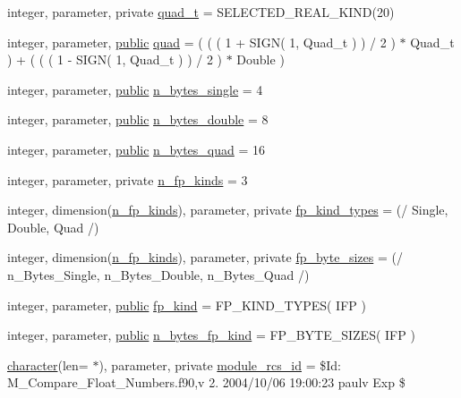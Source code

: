 \begin{DoxyCompactItemize}
integer, parameter, private \hyperlink{namespacem__compare__float__numbers_a3cb67561a1bb5038eddb1aafcce81199}{quad\+\_\+t} = S\+E\+L\+E\+C\+T\+E\+D\+\_\+\+R\+E\+A\+L\+\_\+\+K\+I\+ND(20)
\item 
integer, parameter, \hyperlink{M__stopwatch_83_8txt_a2f74811300c361e53b430611a7d1769f}{public} \hyperlink{namespacem__compare__float__numbers_af11cd62e9032de86b00de623b4eb5c2c}{quad} = ( ( ( 1 + S\+I\+GN( 1, Quad\+\_\+t ) ) / 2 ) $\ast$ Quad\+\_\+t ) + ( ( ( 1 -\/ S\+I\+GN( 1, Quad\+\_\+t ) ) / 2 ) $\ast$ Double )
\item 
integer, parameter, \hyperlink{M__stopwatch_83_8txt_a2f74811300c361e53b430611a7d1769f}{public} \hyperlink{namespacem__compare__float__numbers_a8d387475f5c4f6cc89da998183cf9077}{n\+\_\+bytes\+\_\+single} = 4
\item 
integer, parameter, \hyperlink{M__stopwatch_83_8txt_a2f74811300c361e53b430611a7d1769f}{public} \hyperlink{namespacem__compare__float__numbers_a801fa0d9fea2f2c025618157c128bfe2}{n\+\_\+bytes\+\_\+double} = 8
\item 
integer, parameter, \hyperlink{M__stopwatch_83_8txt_a2f74811300c361e53b430611a7d1769f}{public} \hyperlink{namespacem__compare__float__numbers_abbe80858664126778bff36ea408c71dc}{n\+\_\+bytes\+\_\+quad} = 16
\item 
integer, parameter, private \hyperlink{namespacem__compare__float__numbers_ae5e226645a7448efabc625aa89e78a20}{n\+\_\+fp\+\_\+kinds} = 3
\item 
integer, dimension(\hyperlink{namespacem__compare__float__numbers_ae5e226645a7448efabc625aa89e78a20}{n\+\_\+fp\+\_\+kinds}), parameter, private \hyperlink{namespacem__compare__float__numbers_aa90581babf075fb76565a7ac27674522}{fp\+\_\+kind\+\_\+types} = (/ Single, Double, Quad /)
\item 
integer, dimension(\hyperlink{namespacem__compare__float__numbers_ae5e226645a7448efabc625aa89e78a20}{n\+\_\+fp\+\_\+kinds}), parameter, private \hyperlink{namespacem__compare__float__numbers_a24daff6e230d11a5d81a10bf1c055841}{fp\+\_\+byte\+\_\+sizes} = (/ n\+\_\+\+Bytes\+\_\+\+Single, n\+\_\+\+Bytes\+\_\+\+Double, n\+\_\+\+Bytes\+\_\+\+Quad /)
\item 
integer, parameter, \hyperlink{M__stopwatch_83_8txt_a2f74811300c361e53b430611a7d1769f}{public} \hyperlink{namespacem__compare__float__numbers_a51e33070a2e2a875e279521aaceaeae4}{fp\+\_\+kind} = F\+P\+\_\+\+K\+I\+N\+D\+\_\+\+T\+Y\+P\+ES( I\+FP )
\item 
integer, parameter, \hyperlink{M__stopwatch_83_8txt_a2f74811300c361e53b430611a7d1769f}{public} \hyperlink{namespacem__compare__float__numbers_a48468c49657b53321fe55ac0795ba258}{n\+\_\+bytes\+\_\+fp\+\_\+kind} = F\+P\+\_\+\+B\+Y\+T\+E\+\_\+\+S\+I\+Z\+ES( I\+FP )
\item 
\hyperlink{option__stopwatch_83_8txt_abd4b21fbbd175834027b5224bfe97e66}{character}(len= $\ast$), parameter, private \hyperlink{namespacem__compare__float__numbers_ae0ee7ae6cb351f1a6cf7301460d0d592}{module\+\_\+rcs\+\_\+id} = \textquotesingle{}\$Id\+: M\+\_\+\+Compare\+\_\+\+Float\+\_\+\+Numbers.\+f90,v 2. 2004/10/06 19\+:00\+:23 paulv Exp \$\textquotesingle{}
\end{DoxyCompactItemize}


